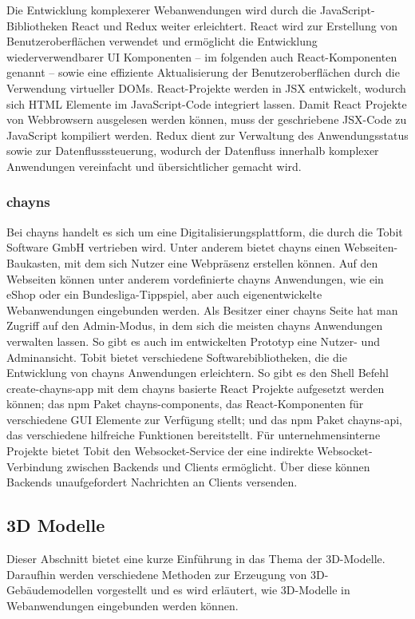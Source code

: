 Die Entwicklung komplexerer Webanwendungen wird durch die JavaScript-Bibliotheken React und Redux weiter erleichtert. React wird zur Erstellung von Benutzeroberflächen verwendet und ermöglicht die Entwicklung wiederverwendbarer \ac{UI} Komponenten – im folgenden auch React-Komponenten genannt – sowie eine effiziente Aktualisierung der Benutzeroberflächen durch die Verwendung virtueller \gls{DOM}s. React-Projekte werden in \ac{JSX} entwickelt, wodurch sich \ac{HTML} Elemente im JavaScript-Code integriert lassen. Damit React Projekte von Webbrowsern ausgelesen werden können, muss der geschriebene \ac{JSX}-Code zu JavaScript kompiliert werden. Redux dient zur Verwaltung des Anwendungsstatus sowie zur Datenflusssteuerung, wodurch der Datenfluss innerhalb komplexer Anwendungen vereinfacht und übersichtlicher gemacht wird.

\subsubsection{chayns}\label{sec:Chayns}
Bei chayns handelt es sich um eine Digitalisierungsplattform, die durch die Tobit Software GmbH vertrieben wird. Unter anderem bietet chayns einen Webseiten-Baukasten, mit dem sich Nutzer eine Webpräsenz erstellen können. Auf den Webseiten können unter anderem vordefinierte chayns Anwendungen, wie ein eShop oder ein Bundesliga-Tippspiel, aber auch eigenentwickelte Webanwendungen eingebunden werden. Als Besitzer einer chayns Seite hat man Zugriff auf den Admin-Modus, in dem sich die meisten chayns Anwendungen verwalten lassen. So gibt es auch im entwickelten Prototyp eine Nutzer- und Adminansicht. Tobit bietet verschiedene Softwarebibliotheken, die die Entwicklung von chayns Anwendungen erleichtern. So gibt es den Shell Befehl create-chayns-app mit dem chayns basierte React Projekte aufgesetzt werden können; das \ac{npm} Paket chayns-components, das React-Komponenten für verschiedene \ac{GUI} Elemente zur Verfügung stellt; und das \ac{npm} Paket chayns-api, das verschiedene hilfreiche Funktionen bereitstellt. Für unternehmensinterne Projekte bietet Tobit den \gls{Websocket}-Service der eine indirekte \gls{Websocket}-Verbindung zwischen Backends und Clients ermöglicht. Über diese können Backends unaufgefordert Nachrichten an Clients versenden.

\subsection{3D Modelle}
Dieser Abschnitt bietet eine kurze Einführung in das Thema der 3D-Modelle. Daraufhin werden verschiedene Methoden zur Erzeugung von 3D-Gebäudemodellen vorgestellt und es wird erläutert, wie 3D-Modelle in Webanwendungen eingebunden werden können.

